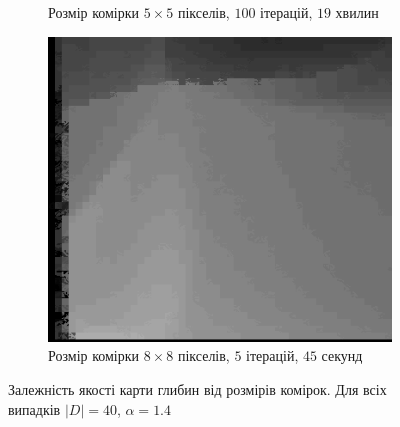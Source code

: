 \begin{figure}[h]
\begin{subfigure}[t]{0.32\textwidth}
        \caption{Розмір комірки $5 \times 5$ пікселів,
                 $100$ ітерацій,
                 $19$ хвилин}
    \end{subfigure}
    \hfill
    \begin{subfigure}[t]{0.32\textwidth}
        \centering
        \includegraphics[width=\textwidth]{images/cloth_superpixel_8}
        \caption{Розмір комірки $8\times 8$ пікселів,
                 $5$ ітерацій,
                 $45$ секунд}
    \end{subfigure}
    \caption{Залежність якості карти глибин від розмірів комірок.
             Для всіх випадків $\left| D \right| = 40$, $\alpha = 1.4$}
    \label{fig:superpixel:cloth:cell:size}
\end{figure}

